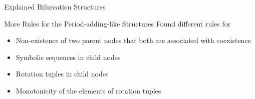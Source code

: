 \begin{frame}{Explained Bifurcation Structures}
	\begin{figure}
	\end{figure}
\end{frame}

\begin{frame}{More Rules for the Period-adding-like Structures}
	Found different rules for
	\begin{itemize}
		\item Non-existence of two parent nodes that both are associated with coexistence \pause
		\item Symbolic sequences in child nodes \pause
		\item Rotation tuples in child nodes \pause
		\item Monotonicity of the elements of rotation tuples
	\end{itemize}
\end{frame}
